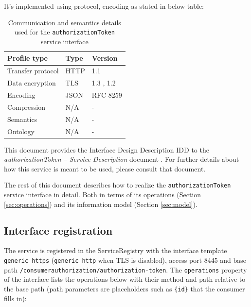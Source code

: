 \documentclass[a4paper]{arrowhead}
\begin{document}
It's implemented using protocol, encoding as stated in below table:
\begin{table}[ht!]
  \centering
  \begin{tabular}{|l|l|l|}
    \hline
    \rowcolor{gray!33} Profile type & Type & Version \\ \hline
    Transfer protocol & HTTP & 1.1 \cite{rfc9112} \\ \hline
    Data encryption & TLS & 1.3 \cite{rfc8446}, 1.2 \cite{rfc5246} \\ \hline
    Encoding & JSON & RFC 8259 \cite{rfc8259} \\ \hline
    Compression & N/A & - \\ \hline
    Semantics & N/A & - \\ \hline
    Ontology & N/A & - \\ \hline
  \end{tabular}
  \caption{Communication and semantics details used for the \texttt{authorizationToken} service interface}
  \label{tab:comunication_semantics_profile}
\end{table}

This document provides the Interface Design Description IDD to the \textit{authorizationToken -- Service Description} document \cite{ca-authorizationToken-sd}.
For further details about how this service is meant to be used, please consult that document.

The rest of this document describes how to realize the \texttt{authorizationToken} service
interface in detail. Both in terms of its operations (Section \ref{sec:operations}) and its information model (Section \ref{sec:model}).

\subsection{Interface registration}

The service is registered in the ServiceRegistry with the interface template \texttt{generic\_\allowbreak{}https} (\texttt{generic\_\allowbreak{}http} when TLS is disabled), access port 8445 and base path \texttt{/\allowbreak{}consumerauthorization/\allowbreak{}authorization-\allowbreak{}token}. The \texttt{operations} property of the interface lists the operations below with their method and path relative to the base path (path parameters are placeholders such as \texttt{\{id\}} that the consumer fills in):
\end{document}
